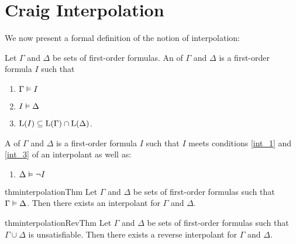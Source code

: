 


\section{Craig Interpolation}
\label{sec:interpolation}

We now present a formal definition of the notion of interpolation:

\begin{defi}
	\label{def:interpolant}
	Let $\Gamma$ and $\Delta$ be sets of first-order formulas.
	An  of $\Gamma$ and $\Delta$ is a first-order formula $I$ such that 
	\begin{enumerate}
		\item $ \Gamma \vDash I$ \label{int_1}
		\item $ I \vDash \Delta $  \label{int_2}
		\item $ \operatorname{L}(I) \subseteq \operatorname{L}(\Gamma) \cap \operatorname{L}(\Delta)$.  \label{int_3}
	\end{enumerate}

	\begin{samepage}
		A  of $\Gamma$ and $\Delta$ is a first-order formula $I$ such that $I$ meets conditions \ref{int_1} and \ref{int_3} of an interpolant as well as:
		\begin{enumerate}
				\renewcommand{\theenumi}{\arabic{enumi}'}
				\setcounter{enumi}{1}
			\item $ \Delta \vDash \lnot I $  \label{int_2prime}
				\qedhere
		\end{enumerate}
	\end{samepage}
\end{defi}

\begin{restatable}[Interpolation]{thm}{interpolationThm}
	\label{thm:interpolation_original}
	Let $\Gamma$ and $\Delta$ be sets of first-order formulas such that $ \Gamma \vDash \Delta $.
	Then there exists an interpolant for $\Gamma$ and $\Delta$.
\end{restatable}
%
\begin{restatable}{thm}{interpolationRevThm}
		\label{thm:interpolation}
		Let $\Gamma$ and $\Delta$ be sets of first-order formulas such that $ \Gamma \cup \Delta $ is unsatisfiable.
		Then there exists a reverse interpolant for $\Gamma$ and\nolinebreak{} $\Delta$.
\end{restatable}



